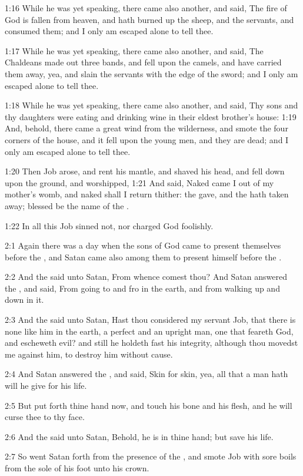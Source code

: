 1:16 While he was yet speaking, there came also another, and said, The
fire of God is fallen from heaven, and hath burned up the sheep, and
the servants, and consumed them; and I only am escaped alone to tell
thee.

1:17 While he was yet speaking, there came also another, and said, The
Chaldeans made out three bands, and fell upon the camels, and have
carried them away, yea, and slain the servants with the edge of the
sword; and I only am escaped alone to tell thee.

1:18 While he was yet speaking, there came also another, and said, Thy
sons and thy daughters were eating and drinking wine in their eldest
brother's house: 1:19 And, behold, there came a great wind from the
wilderness, and smote the four corners of the house, and it fell upon
the young men, and they are dead; and I only am escaped alone to tell
thee.

1:20 Then Job arose, and rent his mantle, and shaved his head, and
fell down upon the ground, and worshipped, 1:21 And said, Naked came I
out of my mother's womb, and naked shall I return thither: the \LORD
gave, and the \LORD hath taken away; blessed be the name of the \LORD.

1:22 In all this Job sinned not, nor charged God foolishly.

2:1 Again there was a day when the sons of God came to present
themselves before the \LORD, and Satan came also among them to present
himself before the \LORD.

2:2 And the \LORD said unto Satan, From whence comest thou? And Satan
answered the \LORD, and said, From going to and fro in the earth, and
from walking up and down in it.

2:3 And the \LORD said unto Satan, Hast thou considered my servant Job,
that there is none like him in the earth, a perfect and an upright
man, one that feareth God, and escheweth evil? and still he holdeth
fast his integrity, although thou movedst me against him, to destroy
him without cause.

2:4 And Satan answered the \LORD, and said, Skin for skin, yea, all
that a man hath will he give for his life.

2:5 But put forth thine hand now, and touch his bone and his flesh,
and he will curse thee to thy face.

2:6 And the \LORD said unto Satan, Behold, he is in thine hand; but
save his life.

2:7 So went Satan forth from the presence of the \LORD, and smote Job
with sore boils from the sole of his foot unto his crown.

